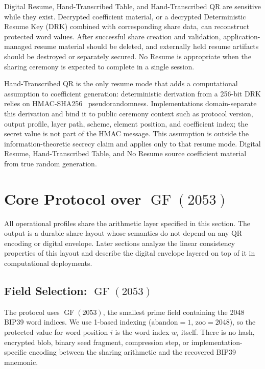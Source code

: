 \documentclass[11pt]{article}
\newcommand{\GF}{\operatorname{GF}}
\begin{document}
Digital Resume, Hand-Transcribed Table, and Hand-Transcribed QR are sensitive while they exist. Decrypted coefficient material, or a decrypted Deterministic Resume Key (DRK) combined with corresponding share data, can reconstruct protected word values. After successful share creation and validation, application-managed resume material should be deleted, and externally held resume artifacts should be destroyed or separately secured. No Resume is appropriate when the sharing ceremony is expected to complete in a single session.

Hand-Transcribed QR is the only resume mode that adds a computational assumption to coefficient generation: deterministic derivation from a 256-bit DRK relies on HMAC-SHA256~\cite{rfc2104} pseudorandomness. Implementations domain-separate this derivation and bind it to public ceremony context such as protocol version, output profile, layer path, scheme, element position, and coefficient index; the secret value is not part of the HMAC message. This assumption is outside the information-theoretic secrecy claim and applies only to that resume mode. Digital Resume, Hand-Transcribed Table, and No Resume source coefficient material from true random generation.

\section{Core Protocol over \texorpdfstring{$\GF(2053)$}{GF(2053)}}
\label{sec:construction}

All operational profiles share the arithmetic layer specified in this section. The output is a durable share layout whose semantics do not depend on any QR encoding or digital envelope. Later sections analyze the linear consistency properties of this layout and describe the digital envelope layered on top of it in computational deployments.

\subsection{Field Selection: \texorpdfstring{$\GF(2053)$}{GF(2053)}}

The protocol uses $\GF(2053)$, the smallest prime field containing the 2048 BIP39 word indices. We use 1-based indexing ($\text{abandon}=1$, $\text{zoo}=2048$), so the protected value for word position $i$ is the word index $w_i$ itself. There is no hash, encrypted blob, binary seed fragment, compression step, or implementation-specific encoding between the sharing arithmetic and the recovered BIP39 mnemonic.
\end{document}
